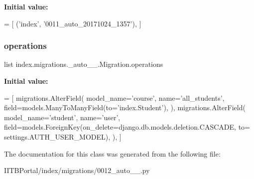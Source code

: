 {\bfseries Initial value\+:}
\begin{DoxyCode}
=  [
        (\textcolor{stringliteral}{'index'}, \textcolor{stringliteral}{'0011\_auto\_20171024\_1357'}),
    ]
\end{DoxyCode}
\mbox{\label{classindex_1_1migrations_1_10012__auto__20171024__1410_1_1Migration_a46d2cfc3d01058911a4107fe58b799ad}} 
\subsubsection{\texorpdfstring{operations}{operations}}
{\footnotesize\ttfamily list index.\+migrations.\+\_\+auto\+\_\+\_.\+Migration.\+operations\hspace{0.3cm}{\ttfamily [static]}}

{\bfseries Initial value\+:}
\begin{DoxyCode}
=  [
        migrations.AlterField(
            model\_name=\textcolor{stringliteral}{'course'},
            name=\textcolor{stringliteral}{'all\_students'},
            field=models.ManyToManyField(to=\textcolor{stringliteral}{'index.Student'}),
        ),
        migrations.AlterField(
            model\_name=\textcolor{stringliteral}{'student'},
            name=\textcolor{stringliteral}{'user'},
            field=models.ForeignKey(on\_delete=django.db.models.deletion.CASCADE, to=
      settings.AUTH\_USER\_MODEL),
        ),
    ]
\end{DoxyCode}


The documentation for this class was generated from the following file\+:\begin{DoxyCompactItemize}
\item 
I\+I\+T\+B\+Portal/index/migrations/0012\+\_\+auto\+\_\+\_.\+py\end{DoxyCompactItemize}
